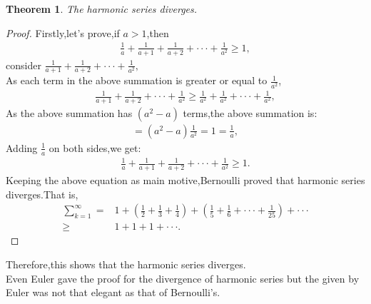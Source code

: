\documentclass[a4paper,reqno,11pt]{book}
\theoremstyle{plain}%
\newtheorem{thm}{Theorem}[chapter]
\theoremstyle{definition}
\begin{document}
\begin{thm}\label{thm:Type 1}
\textit{The harmonic series diverges.}
\end{thm}
\begin{proof}
Firstly,let's prove,if $a>1$,then
\begin{eqnarray*}
    \frac{1}{a}+\frac{1}{a+1}+\frac{1}{a+2}+\cdot\cdot\cdot+\frac{1}{a^2}\geq1,
\end{eqnarray*}
consider $\frac{1}{a+1}+\frac{1}{a+2}+\cdot\cdot\cdot+\frac{1}{a^2},$\\
As each term in the above summation is greater or equal to $\frac{1}{a^2}$,
\begin{eqnarray*}
\frac{1}{a+1}+\frac{1}{a+2}+\cdot\cdot\cdot+\frac{1}{a^2}\geq
    \frac{1}{a^2}+\frac{1}{a^2}+\cdot\cdot\cdot+\frac{1}{a^2},
\end{eqnarray*}
As the above summation has $(a^2-a)$ terms,the above summation is:
\begin{eqnarray*}
    =(a^2-a)\frac{1}{a^2}=1=\frac{1}{a},
\end{eqnarray*}
Adding $\frac{1}{a}$ on both sides,we get:
\begin{eqnarray*}
    \frac{1}{a}+\frac{1}{a+1}+\frac{1}{a+2}+\cdot\cdot\cdot+\frac{1}{a^2}\geq1.
\end{eqnarray*}
Keeping the above equation as main motive,Bernoulli proved that harmonic series diverges.That is,
\begin{align*}
    \sum_{k=1}^{\infty}=&1+\left(\frac{1}{2}+\frac{1}{3}+\frac{1}{4}\right)+\left(\frac{1}{5}+\frac{1}{6}+\cdot\cdot\cdot+\frac{1}{25}\right)+\cdot\cdot\cdot\\
    \geq&1+1+1+\cdot\cdot\cdot.
\end{align*}
\end{proof}
Therefore,this shows that the harmonic series diverges.\\
Even Euler gave the proof for the divergence of harmonic series but the given by Euler was not that elegant as that of Bernoulli's.\\
\end{document}
